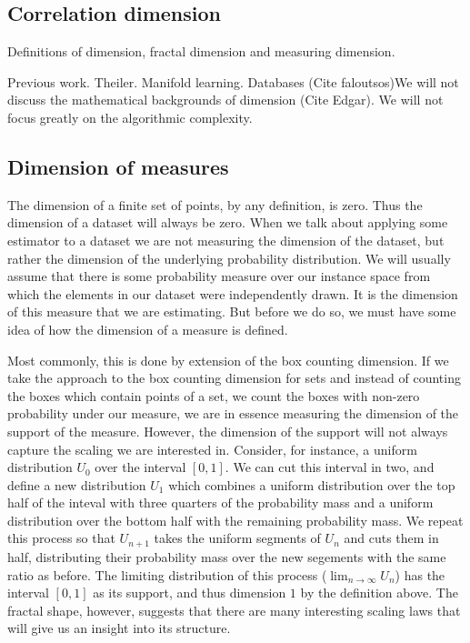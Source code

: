 \documentclass[11pt]{article}
\begin{document}
\subsection{Correlation dimension}

Definitions of dimension, fractal dimension and measuring dimension.

Previous work. Theiler. Manifold learning. Databases (Cite faloutsos)We will not discuss the mathematical backgrounds of dimension (Cite Edgar). We will not focus greatly on the algorithmic complexity.

\subsection{Dimension of measures}

The dimension of a finite set of points, by any definition, is zero. Thus the dimension of a dataset will always be zero. When we talk about applying some estimator to a dataset we are not measuring the dimension of the dataset, but rather the dimension of the underlying probability distribution. We will usually assume that there is some probability measure over our instance space from which the elements in our dataset were independently drawn. It is the dimension of this measure that we are estimating. But before we do so, we must have some idea of how the dimension of a measure is defined.

Most commonly, this is done by extension of the box counting dimension. If we take the approach to the box counting dimension for sets and instead of counting the boxes which contain points of a set, we count the boxes with non-zero probability under our measure, we are in essence measuring the dimension of the support of the measure. However, the dimension of the support will not always capture the scaling we are interested in. Consider, for instance, a uniform distribution $U_0$ over the interval $[0, 1]$. We can cut this interval in two, and define a new distribution $U_1$ which combines a uniform distribution over the top half of the inteval with three quarters of the probability mass and a uniform distribution over the bottom half with the remaining probability mass. We repeat this process so that $U_{n+1}$ takes the uniform segments of $U_n$ and cuts them in half, distributing their probability mass over the new segements with the same ratio as before. The limiting distribution of this process ($\lim_{n \rightarrow \infty} U_n$) has the interval $[0, 1]$ as its support, and thus dimension $1$ by the definition above. The fractal shape, however, suggests that there are many interesting scaling laws that will give us an insight into its structure.
\end{document}
